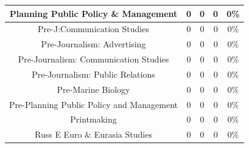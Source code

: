 \documentclass[10pt]{article}
\begin{document}
\begin{longtable}[c]{|ccccc|}
	\multicolumn{1}{|c|}{Planning Public Policy \& Management}       & \multicolumn{1}{c|}{0}                               & \multicolumn{1}{c|}{0}                                   & \multicolumn{1}{c|}{0}                  & 0\%                   \\ \hline
	\multicolumn{1}{|c|}{Pre-J:Communication Studies}                & \multicolumn{1}{c|}{0}                               & \multicolumn{1}{c|}{0}                                   & \multicolumn{1}{c|}{0}                  & 0\%                   \\ \hline
	\multicolumn{1}{|c|}{Pre-Journalism: Advertising}                & \multicolumn{1}{c|}{0}                               & \multicolumn{1}{c|}{0}                                   & \multicolumn{1}{c|}{0}                  & 0\%                   \\ \hline
	\multicolumn{1}{|c|}{Pre-Journalism: Communication Studies}      & \multicolumn{1}{c|}{0}                               & \multicolumn{1}{c|}{0}                                   & \multicolumn{1}{c|}{0}                  & 0\%                   \\ \hline
	\multicolumn{1}{|c|}{Pre-Journalism: Public Relations}           & \multicolumn{1}{c|}{0}                               & \multicolumn{1}{c|}{0}                                   & \multicolumn{1}{c|}{0}                  & 0\%                   \\ \hline
	\multicolumn{1}{|c|}{Pre-Marine Biology}                         & \multicolumn{1}{c|}{0}                               & \multicolumn{1}{c|}{0}                                   & \multicolumn{1}{c|}{0}                  & 0\%                   \\ \hline
	\multicolumn{1}{|c|}{Pre-Planning Public Policy and Management}  & \multicolumn{1}{c|}{0}                               & \multicolumn{1}{c|}{0}                                   & \multicolumn{1}{c|}{0}                  & 0\%                   \\ \hline
	\multicolumn{1}{|c|}{Printmaking}                                & \multicolumn{1}{c|}{0}                               & \multicolumn{1}{c|}{0}                                   & \multicolumn{1}{c|}{0}                  & 0\%                   \\ \hline
	\multicolumn{1}{|c|}{Russ E Euro \& Eurasia Studies}             & \multicolumn{1}{c|}{0}                               & \multicolumn{1}{c|}{0}                                   & \multicolumn{1}{c|}{0}                  & 0\%                   \\ \hline

\end{longtable}
\end{document}
